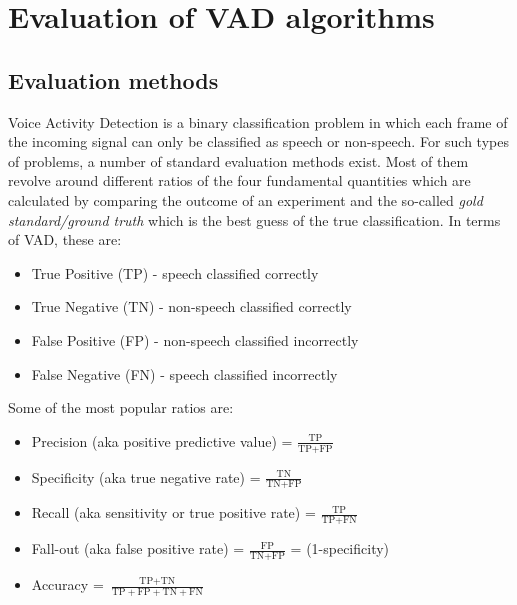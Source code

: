 
\chapter{Evaluation of VAD algorithms} %

\label{Chapter4} %



\section{Evaluation methods}

Voice Activity Detection is a binary classification problem in which each frame of the incoming signal can only be classified as speech or non-speech. For such types of problems, a number of standard evaluation methods exist. Most of them revolve around different ratios of the four fundamental quantities which are calculated by comparing the outcome of an experiment and the so-called \emph{gold standard/ground truth} which is the best guess of the true classification. In terms of VAD, these are:

\begin{itemize}
\item True Positive (TP) - speech classified correctly
\item True Negative (TN) - non-speech classified correctly
\item False Positive (FP) - non-speech classified incorrectly
\item False Negative (FN) - speech classified incorrectly
\end{itemize}

Some of the most popular ratios are:
\begin{itemize}
\item Precision (aka positive predictive value) = $\frac{\text{TP}}{\text{TP}+\text{FP}}$
\item Specificity (aka true negative rate) = $\frac{\text{TN}}{\text{TN}+\text{FP}}$
\item Recall (aka sensitivity or true positive rate) = $\frac{\text{TP}}{\text{TP}+\text{FN}}$
\item Fall-out (aka false positive rate) = $\frac{\text{FP}}{\text{TN}+\text{FP}}$ = (1-specificity)
\item Accuracy = $\frac{\text{TP}+\text{TN}}{\text{TP}+\text{FP}+\text{TN}+\text{FN}}$
\end{itemize}

